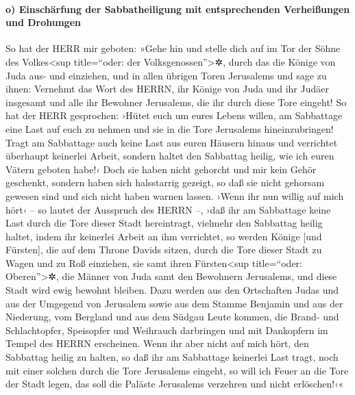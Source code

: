 \hypertarget{o-einschuxe4rfung-der-sabbatheiligung-mit-entsprechenden-verheiuxdfungen-und-drohungen}{%
\paragraph{o) Einschärfung der Sabbatheiligung mit entsprechenden
Verheißungen und
Drohungen}\label{o-einschuxe4rfung-der-sabbatheiligung-mit-entsprechenden-verheiuxdfungen-und-drohungen}}

So hat der HERR mir geboten: »Gehe hin und stelle dich
auf im Tor der Söhne des Volkes\textless sup title=``oder: der
Volksgenossen''\textgreater✲, durch das die Könige von Juda aus- und
einziehen, und in allen übrigen Toren Jerusalems und sage
zu ihnen: Vernehmt das Wort des HERRN, ihr Könige von Juda und ihr
Judäer insgesamt und alle ihr Bewohner Jerusalems, die ihr durch diese
Tore eingeht! So hat der HERR gesprochen: ›Hütet euch um
eures Lebens willen, am Sabbattage eine Last auf euch zu nehmen und sie
in die Tore Jerusalems hineinzubringen! Tragt am
Sabbattage auch keine Last aus euren Häusern hinaus und verrichtet
überhaupt keinerlei Arbeit, sondern haltet den Sabbattag heilig, wie ich
euren Vätern geboten habe!‹ Doch sie haben nicht gehorcht
und mir kein Gehör geschenkt, sondern haben sich halsstarrig gezeigt, so
daß sie nicht gehorsam gewesen sind und sich nicht haben warnen lassen.
›Wenn ihr nun willig auf mich hört‹ -- so lautet der
Ausspruch des HERRN --, ›daß ihr am Sabbattage keine Last durch die Tore
dieser Stadt hereintragt, vielmehr den Sabbattag heilig haltet, indem
ihr keinerlei Arbeit an ihm verrichtet, so werden Könige
{[}und Fürsten{]}, die auf dem Throne Davids sitzen, durch die Tore
dieser Stadt zu Wagen und zu Roß einziehen, sie samt ihren
Fürsten\textless sup title=``oder: Oberen''\textgreater✲, die Männer von
Juda samt den Bewohnern Jerusalems, und diese Stadt wird ewig bewohnt
bleiben. Dazu werden aus den Ortschaften Judas und aus
der Umgegend von Jerusalem sowie aus dem Stamme Benjamin und aus der
Niederung, vom Bergland und aus dem Südgau Leute kommen, die Brand- und
Schlachtopfer, Speisopfer und Weihrauch darbringen und mit Dankopfern im
Tempel des HERRN erscheinen. Wenn ihr aber nicht auf mich
hört, den Sabbattag heilig zu halten, so daß ihr am Sabbattage keinerlei
Last tragt, noch mit einer solchen durch die Tore Jerusalems eingeht, so
will ich Feuer an die Tore der Stadt legen, das soll die Paläste
Jerusalems verzehren und nicht erlöschen!‹«

